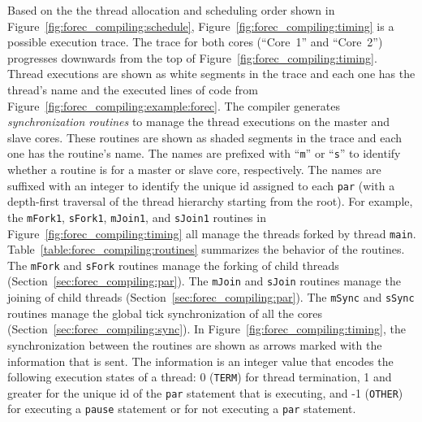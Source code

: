 Based on the the thread allocation and scheduling order shown in 
Figure~\ref{fig:forec_compiling:schedule}, 
Figure~\ref{fig:forec_compiling:timing} is a possible execution trace.
The trace for both cores (``Core~1'' and ``Core~2'') 
progresses downwards from the top of Figure~\ref{fig:forec_compiling:timing}.
Thread executions are shown as white segments in the 
trace and each one has the thread's name and the executed 
lines of code from Figure~\ref{fig:forec_compiling:example:forec}.
The compiler generates \emph{synchronization routines} to 
manage the thread executions on the master and slave
cores. These routines are shown as shaded segments in the 
trace and each one has the routine's name. 
The names are prefixed with ``\verb$m$'' or ``\verb$s$'' 
to identify whether a routine is for a master or slave 
core, respectively. The names are suffixed with an integer 
to identify the unique id assigned to each \texttt{par} (with a 
depth-first traversal of the thread hierarchy starting from the root).
For example, the \verb$mFork1$, 
\verb$sFork1$, \verb$mJoin1$, and \verb$sJoin1$ routines in 
Figure~\ref{fig:forec_compiling:timing} all
manage the threads forked by thread \verb$main$. 
Table~\ref{table:forec_compiling:routines}
summarizes the behavior of the routines. The 
\verb$mFork$ and \verb$sFork$ routines manage
the forking of child threads (Section~\ref{sec:forec_compiling:par}). The 
\verb$mJoin$ and \verb$sJoin$ routines manage
the joining of child threads (Section~\ref{sec:forec_compiling:par}). 
The \verb$mSync$ and \verb$sSync$ routines manage
the global tick synchronization of all the cores (Section~\ref{sec:forec_compiling:sync}).
In Figure~\ref{fig:forec_compiling:timing}, the synchronization 
between the routines are shown as arrows marked 
with the information that is sent. The information is an 
integer value that encodes the following execution states 
of a thread: 0 (\verb$TERM$) for thread termination, 1 and 
greater for the unique id of the \texttt{par} statement that 
is executing, and -1 
(\verb$OTHER$) for executing a \verb$pause$ statement
or for not executing a \verb$par$ statement.

